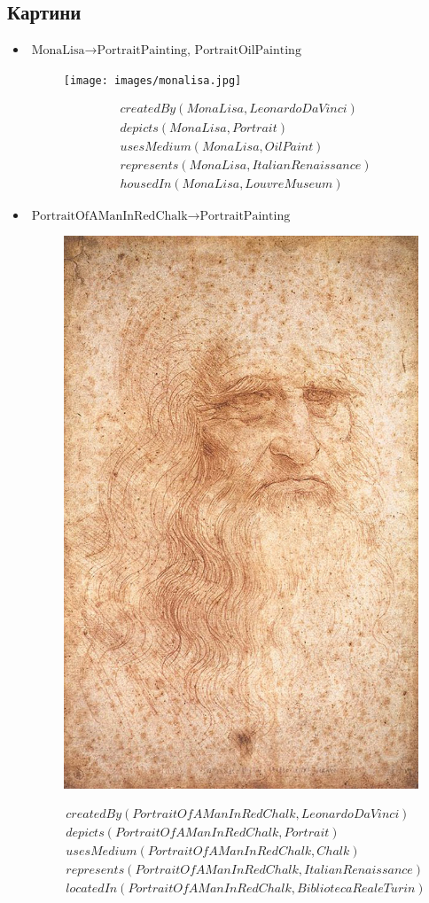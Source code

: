 \documentclass{article}
\begin{document}
\subsection*{Картини}
\begin{itemize}
  \item $\text{MonaLisa} \to \text{PortraitPainting, PortraitOilPainting}$
    \begin{figure}[H]
      \centering
      \texttt{[image: images/monalisa.jpg]}
    \end{figure}
    \begin{align*}
      &createdBy(MonaLisa, LeonardoDaVinci)\\
      &depicts(MonaLisa, Portrait)\\
      &usesMedium(MonaLisa, OilPaint)\\
      &represents(MonaLisa, ItalianRenaissance)\\
      &housedIn(MonaLisa, LouvreMuseum)
    \end{align*}
  \item $\text{PortraitOfAManInRedChalk} \to \text{PortraitPainting}$
    \begin{figure}[H]
      \centering
      \includegraphics[width=0.35\linewidth]{images/maninredchalk.jpg}
    \end{figure}
    \begin{align*}
      &createdBy(PortraitOfAManInRedChalk, LeonardoDaVinci)\\
      &depicts(PortraitOfAManInRedChalk, Portrait)\\
      &usesMedium(PortraitOfAManInRedChalk, Chalk)\\
      &represents(PortraitOfAManInRedChalk, ItalianRenaissance)\\
      &locatedIn(PortraitOfAManInRedChalk, BibliotecaRealeTurin)
    \end{align*}

\end{itemize}
\end{document}
